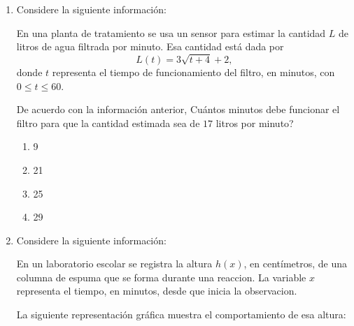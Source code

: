 \documentclass[12pt]{article}
\newcommand{\puntograficoafirmacioncuatro}{0.09}
\begin{document}
\begin{enumerate}[label=\textbf{\arabic*.}, itemsep=2.5cm]
\Needspace{0.60\textheight}
\item
Considere la siguiente informaci\'on:

En una planta de tratamiento se usa un sensor para estimar la cantidad $L$ de litros de agua filtrada por minuto. Esa cantidad est\'a dada por
\[
L(t)=3\sqrt{t+4}+2,
\]
donde $t$ representa el tiempo de funcionamiento del filtro, en minutos, con $0 \leq t \leq 60$.

De acuerdo con la informaci\'on anterior, \textquestiondown Cu\'antos minutos debe funcionar el filtro para que la cantidad estimada sea de $17$ litros por minuto?

\begin{enumerate}[label=\Alph*)]
  \item 9
  \item 21
  \item 25
  \item 29
\end{enumerate}

\Needspace{0.54\textheight}
\item
Considere la siguiente informaci\'on:

En un laboratorio escolar se registra la altura $h(x)$, en cent\'imetros, de una columna de espuma que se forma durante una reaccion. La variable $x$ representa el tiempo, en minutos, desde que inicia la observacion.

La siguiente representaci\'on gr\'afica muestra el comportamiento de esa altura:

\begin{center}
\end{center}


\end{enumerate}
\end{document}
